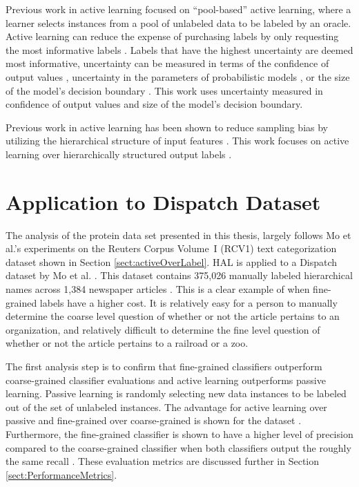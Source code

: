 \documentclass[ms]{nuthesis}
\begin{document}
\par Previous work in active learning
focused on ``pool-based'' active learning, where a learner selects
instances from a pool of unlabeled data to be labeled by an oracle.
Active learning can reduce the expense of purchasing labels by only
requesting the most informative labels \cite{Rubens2011}. Labels that
have the highest uncertainty are deemed most informative, uncertainty
can be measured in terms of the confidence of output values
\cite{Merialdo2001}, uncertainty in the parameters of probabilistic models
\cite{Hofmann2003}, or the size of the model's decision boundary
\cite{Schohn2000}. This work uses uncertainty measured in confidence of
output values and size of the model's decision boundary.

\par Previous work in active learning has been shown to reduce
sampling bias by utilizing the hierarchical structure of input
features \cite{Dasgupta2008, Symons2006}. This work focuses on
active learning over hierarchically structured output
labels \cite{yugi}.


\section{Application to Dispatch Dataset}
\par The analysis of the protein data set presented in this thesis, largely
follows Mo et al.'s \cite{yugi} experiments on the Reuters Corpus Volume~I (RCV1)
 text categorization dataset shown in Section \ref{sect:activeOverLabel}. HAL is
 applied to a Dispatch dataset by Mo et al. \cite{yugi}. This dataset contains 375,026 manually labeled
hierarchical names across 1,384 newspaper articles \cite{Lewis2004}. This is a
clear example of when fine-grained labels have a higher cost. It is relatively
easy for a person to manually
determine the coarse level question of whether or not the article pertains to an organization,
and relatively difficult to determine the fine level question of whether or not the article
pertains to a railroad or a zoo.
\par The first analysis step is to confirm that fine-grained classifiers outperform
coarse-grained classifier evaluations and active learning outperforms passive learning. Passive learning is
randomly selecting new data instances to be labeled out of the set of unlabeled instances.
 The advantage for active learning over passive and fine-grained over coarse-grained is shown for the
 dataset \cite{yugi}. Furthermore, the fine-grained classifier is shown to have a higher level of
 precision compared to the coarse-grained classifier when both classifiers output the roughly the
 same recall  \cite{yugi}. These evaluation metrics are discussed further in
 Section \ref{sect:PerformanceMetrics}.
\end{document}
